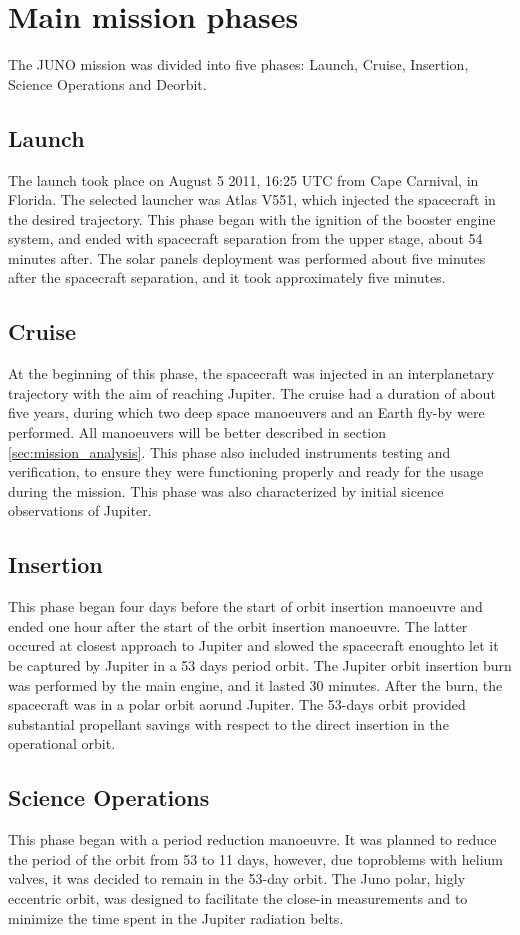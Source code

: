 \section{Main mission phases}
\label{sec:phases}
The JUNO mission was divided into five phases: Launch, Cruise, Insertion, Science Operations and Deorbit.
\subsection{Launch}
The launch took place on August 5 2011, 16:25 UTC from Cape Carnival, in Florida. The selected launcher was Atlas V551, which injected the spacecraft in the 
desired trajectory. This phase began with the ignition of the booster engine system, and ended with spacecraft separation from the upper
 stage,  about 54 minutes after. The solar panels deployment was performed about five minutes after the spacecraft separation, and it took approximately five minutes.
 \subsection{Cruise}
 At the beginning of this phase, the spacecraft was injected in an interplanetary trajectory with the aim of reaching Jupiter. The cruise had a duration of about 
 five years, during which two deep space manoeuvers  and an Earth fly-by were performed. All manoeuvers will be better described in 
 section \ref{sec:mission_analysis}. This phase also included instruments testing and verification, to ensure they were functioning properly and ready for the usage
 during the mission. This phase was also characterized by initial sicence observations of Jupiter. 
 \subsection{Insertion}
 This phase began four days before the start of orbit insertion manoeuvre and ended one hour after the start of the orbit insertion manoeuvre. The latter
 occured at closest approach to Jupiter and slowed the spacecraft enoughto let it be captured by Jupiter in a 53 days period orbit. The Jupiter orbit insertion
 burn was performed by the main engine, and it lasted 30 minutes. After the burn, the spacecraft was in a polar orbit aorund Jupiter. The 53-days orbit
 provided substantial propellant savings with respect to the direct insertion in the operational orbit.
 \subsection{Science Operations}
 This phase began with a period reduction manoeuvre. It was planned to reduce the period of the orbit from 53 to 11 days, however, due toproblems 
  with helium valves, it was decided to remain in the 53-day orbit. The Juno polar, higly eccentric orbit, was designed to facilitate the close-in measurements and
  to minimize the time spent in the Jupiter radiation belts.
